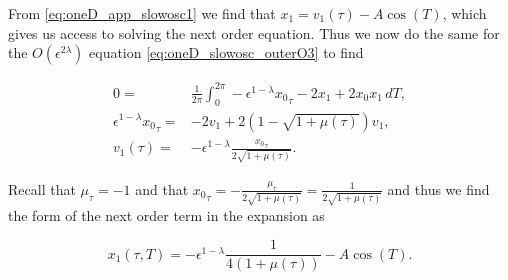 From \eqref{eq:oneD_app_slowosc1} we find that $x_1=v_1(\tau)-A\cos(T)$, which gives us access to solving the next order equation. Thus we now do the same for the $O(\epsilon^{2\lambda})$ equation \eqref{eq:oneD_slowosc_outerO3} to find

\begin{equation}
\begin{aligned}
0=&\frac{1}{2\pi}\int_0^{2\pi}-\epsilon^{1-\lambda}{x_0}_\tau -2x_1+2x_0x_1\,dT,\\
\epsilon^{1-\lambda}{x_0}_\tau=& -2v_1+2(1-\sqrt{1+\mu(\tau)})v_1,\\
v_1(\tau) =& -\epsilon^{1-\lambda}\frac{{x_0}_\tau}{2\sqrt{1+\mu(\tau)}}.
\end{aligned}
\end{equation}

Recall that $\mu_\tau=-1$ and that ${x_0}_\tau = -\frac{{\mu}_\tau}{2\sqrt{1+\mu(\tau)}}=\frac{1}{2\sqrt{1+\mu(\tau)}}$ and thus we find the form of the next order term in the expansion as

\begin{equation}
x_1(\tau,T) = -\epsilon^{1-\lambda}\frac{1}{4(1+\mu(\tau))}-A\cos(T).
\end{equation}